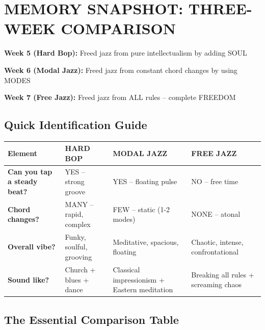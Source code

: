 \documentclass[11pt]{article}
\begin{document}
\newpage

\section{MEMORY SNAPSHOT: THREE-WEEK COMPARISON}

\begin{tcolorbox}[colback=blue!5!white, colframe=blue!75!black, title=\textbf{THE BIG PICTURE: Progressive Liberation}]
\textbf{Week 5 (Hard Bop):} Freed jazz from pure intellectualism by adding SOUL

\textbf{Week 6 (Modal Jazz):} Freed jazz from constant chord changes by using MODES

\textbf{Week 7 (Free Jazz):} Freed jazz from ALL rules – complete FREEDOM
\end{tcolorbox}

\subsection*{Quick Identification Guide}

\begin{center}
\begin{tabular}{|p{3.5cm}|p{3.5cm}|p{3.5cm}|p{3.5cm}|}
\hline
\textbf{Element} & \textbf{\textcolor{hardbop}{HARD BOP}} & \textbf{\textcolor{modal}{MODAL JAZZ}} & \textbf{\textcolor{freejazz}{FREE JAZZ}} \\
\hline
\textbf{Can you tap a steady beat?} & \textcolor{hardbop}{YES – strong groove} & \textcolor{modal}{YES – floating pulse} & \textcolor{freejazz}{NO – free time} \\
\hline
\textbf{Chord changes?} & \textcolor{hardbop}{MANY – rapid, complex} & \textcolor{modal}{FEW – static (1-2 modes)} & \textcolor{freejazz}{NONE – atonal} \\
\hline
\textbf{Overall vibe?} & \textcolor{hardbop}{Funky, soulful, grooving} & \textcolor{modal}{Meditative, spacious, floating} & \textcolor{freejazz}{Chaotic, intense, confrontational} \\
\hline
\textbf{Sound like?} & \textcolor{hardbop}{Church + blues + dance} & \textcolor{modal}{Classical impressionism + Eastern meditation} & \textcolor{freejazz}{Breaking all rules + screaming chaos} \\
\hline
\end{tabular}
\end{center}

\subsection*{The Essential Comparison Table}
\end{document}
